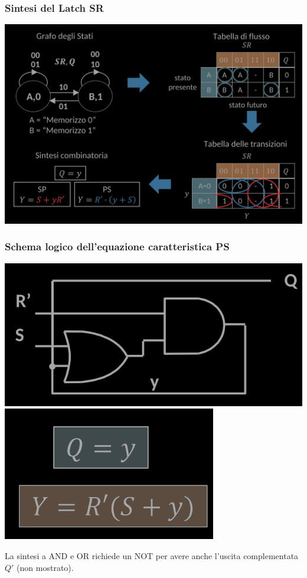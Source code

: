 \documentclass{article}
\begin{document}
\subsubsection{Sintesi del Latch SR}
\begin{center}
    \includegraphics[scale=0.4]{SRsintesi.png}
\end{center}
\subsubsection*{Schema logico dell'equazione caratteristica PS}
\begin{center}
    \includegraphics[scale=0.3]{latchSR-schema-logico.png}
\includegraphics[scale=0.3]{latchSR-PS.png}
\end{center}
La sintesi a AND e OR richiede un NOT per avere anche l’uscita complementata $Q'$ (non mostrato).
\end{document}
